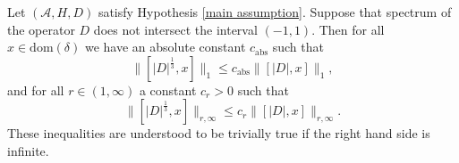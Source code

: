     \begin{lem}\label{13 lemma} 
        Let $(\mathcal{A},H,D)$ satisfy Hypothesis \ref{main assumption}. 
        Suppose that spectrum of the operator $D$ does not intersect the interval $(-1,1).$ Then for all $x \in \mathrm{dom}(\delta)$ we have an absolute constant $c_{\mathrm{abs}}$ such that
        \begin{equation*}
            \|[|D|^{\frac13},x]\|_1\leq c_{\mathrm{abs}}\|[|D|,x]\|_1,
        \end{equation*}
        and for all $r \in (1,\infty)$ a constant $c_r > 0$ such that
        \begin{equation*}
            \|[|D|^{\frac13},x]\|_{r,\infty}\leq c_r\|[|D|,x]\|_{r,\infty}.
        \end{equation*}
        These inequalities are understood to be trivially true if the right hand side is infinite.
    \end{lem}
